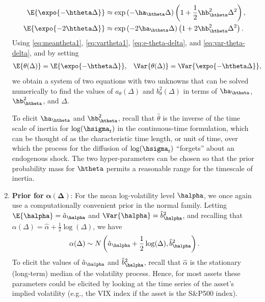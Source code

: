 \begin{enumerate}
\begin{align}
\E{\expo{-\htheta \Delta}} &\approx \exp \left(-\ha_{\htheta} \Delta \right) \left( 1 + \frac{1}{2} \hb_{\htheta}^2 \Delta^2 \right) \label{eq:e-theta-delta}, \\
%
\E{\expo{-2\htheta \Delta}} &\approx \exp \left(-2\ha_{\htheta} \Delta \right) \left( 1 + 2 \hb_{\htheta}^2 \Delta^2 \right) \label{eq:var-theta-delta}.
\end{align}
Using \eqref{eq:meantheta1}, \eqref{eq:vartheta1}, \eqref{eq:e-theta-delta}, and \eqref{eq:var-theta-delta}, and by setting
\begin{align*}
  \E{\theta(\Delta)}  &= \E{\expo{-\htheta \Delta}},& \Var{\theta(\Delta)} &= \Var{\expo{-\htheta \Delta}},
\end{align*}
we obtain a system of two equations with two unknowns that can be solved numerically to find the values of $a_\theta(\Delta)$ and $b^2_\theta(\Delta)$ in terms of $\ha_{\htheta}$, $\hb^2_{\htheta}$, and $\Delta$.

To elicit $\ha_{\htheta}$ and $\hb^2_{\htheta}$, recall that $\hat{\theta}$ is the inverse of the time scale of inertia for $\log(\hsigma_t)$ in the continuous-time formulation, which can be thought of as the characteristic time length, or unit of time, over which the process for the diffusion of $\log(\hsigma_t)$ ``forgets'' about an endogenous shock. The two hyper-parameters can be chosen so that the prior probability mass for $\htheta$ permits a reasonable range for the timescale of inertia.


\item{\textbf{Prior for } $\boldsymbol{\alpha}(\boldsymbol{\Delta})$:} For the mean log-volatility level $\halpha$, we once again use a computationally convenient prior in the normal family.  Letting $\E{\halpha} = \hat{a}_{\halpha}$ and $\Var{\halpha} = \hat{b}^2_{\halpha}$, and recalling that $\alpha(\Delta) = \hat{\alpha} + \frac{1}{2}\log(\Delta)$, we have
$$
\alpha(\Delta) \sim N\left(\hat{a}_{\halpha} + \frac{1}{2} \log(\Delta), \hat{b}^2_{\halpha}\right).
$$
To elicit the values of $\hat{a}_{\halpha}$ and $\hat{b}^2_{\halpha}$, recall that $\hat{\alpha}$ is the stationary (long-term) median of the volatility process.  Hence, for most assets these parameters could be elicited by looking at the time series of the asset's implied volatility (e.g., the VIX index if the asset is the S\&P500 index).



\end{enumerate}
